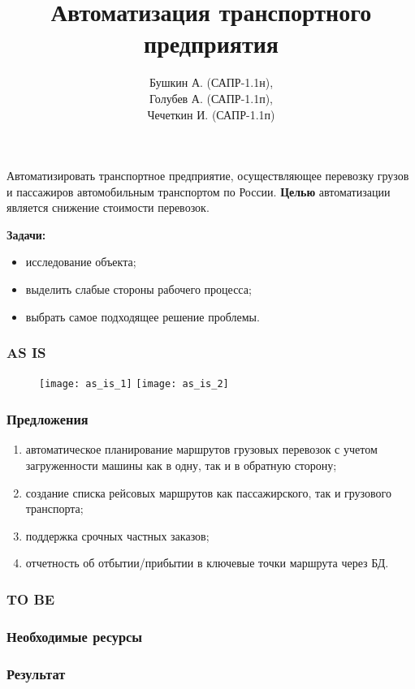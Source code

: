 \title{Автоматизация транспортного предприятия}
\author{Бушкин А. (САПР-1.1н), \\
  Голубев А. (САПР-1.1п), \\
  Чечеткин И. (САПР-1.1п)}
\institute{}
\date{}

\begin{frame}
  \titlepage
\end{frame}

\begin{frame}
  Автоматизировать транспортное предприятие, осуществляющее перевозку грузов
  и пассажиров автомобильным транспортом по России. \textbf{Целью}
  автоматизации является снижение стоимости перевозок.
  
  \vspace{5mm}
  \textbf{Задачи:}
    \begin{itemize}
      \item исследование объекта;
      \item выделить слабые стороны рабочего процесса;
      \item выбрать самое подходящее решение проблемы.
    \end{itemize}
\end{frame}

\begin{frame}
  \frametitle{AS IS}
    \begin{figure}
      \center
      \texttt{[image: as\_is\_1]}
      \texttt{[image: as\_is\_2]}
    \end{figure}
\end{frame}

\begin{frame}
  \frametitle{Предложения}
  \begin{enumerate}
    \item автоматическое планирование маршрутов грузовых перевозок с учетом
      загруженности машины как в одну, так и в обратную сторону;
    \item создание списка рейсовых маршрутов как пассажирского, так и
      грузового транспорта;
    \item поддержка срочных частных заказов;
    \item отчетность об отбытии/прибытии в ключевые точки маршрута через БД.
  \end{enumerate}
\end{frame}

\begin{frame}
  \frametitle{TO BE}
    \begin{figure}
      \center
    \end{figure}
\end{frame}

\begin{frame}
  \frametitle{Необходимые ресурсы}
\end{frame}

\begin{frame}
  \frametitle{Результат}
\end{frame}